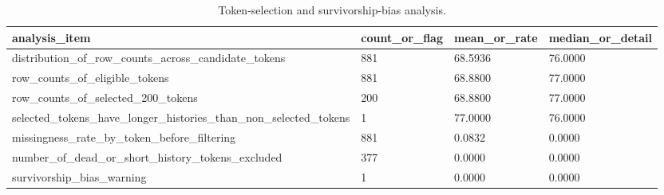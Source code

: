 \begin{table}[htbp]
\centering
\begin{tabular}{llll}
\hline
analysis_item & count_or_flag & mean_or_rate & median_or_detail \\
\hline
distribution_of_row_counts_across_candidate_tokens & 881 & 68.5936 & 76.0000 \\
row_counts_of_eligible_tokens & 881 & 68.8800 & 77.0000 \\
row_counts_of_selected_200_tokens & 200 & 68.8800 & 77.0000 \\
selected_tokens_have_longer_histories_than_non_selected_tokens & 1 & 77.0000 & 76.0000 \\
missingness_rate_by_token_before_filtering & 881 & 0.0832 & 0.0000 \\
number_of_dead_or_short_history_tokens_excluded & 377 & 0.0000 & 0.0000 \\
survivorship_bias_warning & 1 & 0.0000 & 0.0000 \\
\hline
\end{tabular}
\caption{Token-selection and survivorship-bias analysis.}
\label{table_token_selection_bias}
\end{table}
